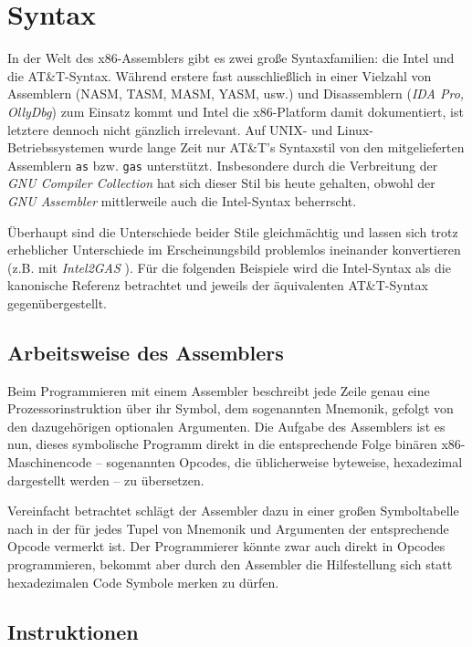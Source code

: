\section{Syntax}

In der Welt des x86-Assemblers gibt es zwei große Syntaxfamilien: die Intel und
die AT\&T-Syntax. Während erstere fast ausschließlich in einer Vielzahl von Assemblern (NASM, TASM, MASM, YASM, usw.) und Disassemblern (\emph{IDA Pro, OllyDbg}\cite{disasm}) zum Einsatz kommt
und Intel die x86-Platform damit dokumentiert, ist letztere dennoch nicht
gänzlich irrelevant. Auf UNIX- und Linux-Betriebssystemen wurde lange Zeit nur AT\&T's
Syntaxstil von den mitgelieferten Assemblern \texttt{as} bzw. \texttt{gas}
unterstützt. Insbesondere durch die Verbreitung der \emph{GNU Compiler Collection}
hat sich dieser Stil bis heute gehalten, obwohl der \emph{GNU Assembler} mittlerweile
auch die Intel-Syntax beherrscht.

Überhaupt sind die Unterschiede beider Stile gleichmächtig und lassen sich
trotz erheblicher Unterschiede im Erscheinungsbild problemlos ineinander konvertieren
(z.B. mit \emph{Intel2GAS} \cite{i2g}). Für die folgenden Beispiele wird die
Intel-Syntax als die kanonische Referenz betrachtet und jeweils der
äquivalenten AT\&T-Syntax gegenübergestellt.

\subsection{Arbeitsweise des Assemblers}

Beim Programmieren mit einem Assembler beschreibt jede Zeile genau eine
Prozessorinstruktion über ihr Symbol, dem sogenannten Mnemonik, gefolgt von
den dazugehörigen optionalen Argumenten. Die Aufgabe des Assemblers ist es nun,
dieses symbolische Programm direkt in die entsprechende Folge binären
x86-Maschinencode – sogenannten Opcodes, die üblicherweise byteweise,
hexadezimal dargestellt werden – zu übersetzen.

Vereinfacht betrachtet schlägt der Assembler dazu in einer großen Symboltabelle nach in der für jedes Tupel von Mnemonik und Argumenten der entsprechende Opcode vermerkt
ist. Der Programmierer könnte zwar auch direkt in Opcodes programmieren, bekommt
aber durch den Assembler die Hilfestellung sich statt hexadezimalen Code
Symbole merken zu dürfen.

\subsection{Instruktionen}

